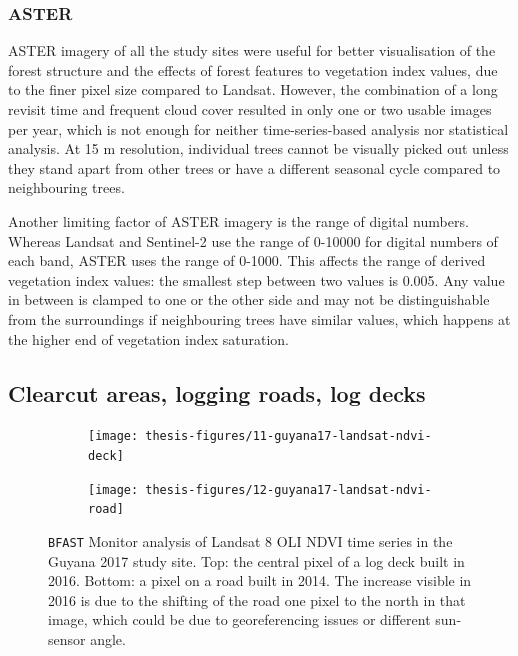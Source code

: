 \documentclass[a4paper,12pt]{scrbook}
\begin{document}

\subsubsection{ASTER}


\ac{ASTER} imagery of all the study sites were useful for better visualisation of the forest structure and the effects of forest features to vegetation index values, due to the finer pixel size compared to Landsat. However, the combination of a long revisit time and frequent cloud cover resulted in only one or two usable images per year, which is not enough for neither time-series-based analysis nor statistical analysis. At 15 m resolution, individual trees cannot be visually picked out unless they stand apart from other trees or have a different seasonal cycle compared to neighbouring trees.

Another limiting factor of \ac{ASTER} imagery is the range of digital numbers. Whereas Landsat and Sentinel-2 use the range of 0-10000 for digital numbers of each band, \ac{ASTER} uses the range of 0-1000. This affects the range of derived vegetation index values: the smallest step between two values is 0.005. Any value in between is clamped to one or the other side and may not be distinguishable from the surroundings if neighbouring trees have similar values, which happens at the higher end of vegetation index saturation.

\subsection{Clearcut areas, logging roads, log decks}

\begin{figure}
  \begin{subfigure}{\textwidth}
    \centering
    \texttt{[image: thesis-figures/11-guyana17-landsat-ndvi-deck]}
  \end{subfigure}
  \begin{subfigure}{\textwidth}
    \centering
    \texttt{[image: thesis-figures/12-guyana17-landsat-ndvi-road]}
  \end{subfigure}
  \caption{\texttt{BFAST} Monitor analysis of Landsat 8 \ac{OLI} \ac{NDVI} time series in the Guyana 2017 study site. Top: the central pixel of a log deck built in 2016. Bottom: a pixel on a road built in 2014. The increase visible in 2016 is due to the shifting of the road one pixel to the north in that image, which could be due to georeferencing issues or different sun-sensor angle.}
  \label{fig-guyana17-landsat-ndvi-deck}
\end{figure}
\end{document}

